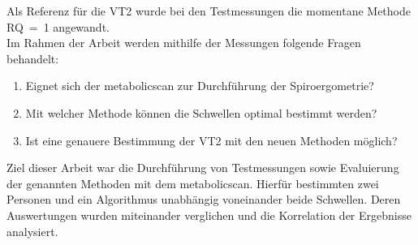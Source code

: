 %
Als Referenz für die VT2 wurde bei den Testmessungen die momentane Methode RQ~=~1 angewandt.\\
Im Rahmen der Arbeit werden mithilfe der Messungen folgende Fragen behandelt:
%
\begin{enumerate}
	\item Eignet sich der metabolicscan zur Durchführung der Spiroergometrie?
	\item Mit welcher Methode können die Schwellen optimal bestimmt werden?
	\item Ist eine genauere Bestimmung der VT2 mit den neuen Methoden möglich?
\end{enumerate}
%
Ziel dieser Arbeit war die Durchführung von Testmessungen sowie Evaluierung der genannten Methoden mit dem metabolicscan. Hierfür bestimmten zwei Personen und ein Algorithmus unabhängig voneinander beide Schwellen. Deren Auswertungen wurden miteinander verglichen und die Korrelation der Ergebnisse analysiert.
\clearpage